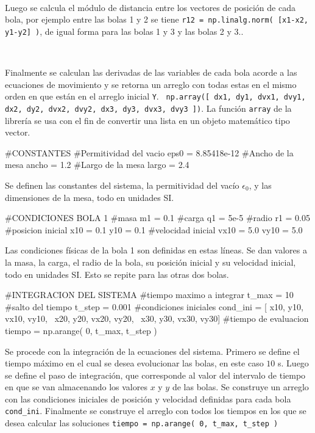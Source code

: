 \

Luego se calcula el módulo de distancia entre los vectores de posición de
cada bola, por ejemplo entre las bolas 1 y 2 se tiene
\texttt{r12 = np.linalg.norm( [x1-x2, y1-y2] )}, de igual forma para las 
bolas 1 y 3 y las bolas 2 y 3..

\

Finalmente se calculan las derivadas de las variables de cada bola acorde
a las ecuaciones de movimiento y se retorna un arreglo con todas estas en 
el mismo orden en que están en el arreglo inicial \texttt{Y}. \texttt{
np.array([ dx1, dy1, dvx1, dvy1, dx2, dy2, dvx2, dvy2, dx3, dy3, dvx3, dvy3 ])}.
La función \texttt{array} de la librería \numpy se usa con el fin de 
convertir una lista en un objeto matemático tipo vector.


\begin{listing}[style=python, numbers = none]
#CONSTANTES
#Permitividad del vacio
eps0 = 8.85418e-12
#Ancho de la mesa
ancho = 1.2
#Largo de la mesa
largo = 2.4
\end{listing}
Se definen las constantes del sistema, la permitividad del vacío $\epsilon_0$,
y las dimensiones de la mesa, todo en unidades SI.


\begin{listing}[style=python, numbers = none]
#CONDICIONES BOLA 1
#masa
m1 = 0.1
#carga
q1 = 5e-5
#radio 
r1 = 0.05
#posicion inicial
x10 = 0.1
y10 = 0.1
#velocidad inicial
vx10 = 5.0
vy10 = 5.0
\end{listing}
Las condiciones físicas de la bola 1 son definidas en estas líneas. Se dan
valores a la masa, la carga, el radio de la bola, su posición inicial y su 
velocidad inicial, todo en unidades SI. Esto se repite para las otras dos
bolas.


\begin{listing}[style=python, numbers = none]
#INTEGRACION DEL SISTEMA
#tiempo maximo a integrar
t_max = 10
#salto del tiempo
t_step = 0.001
#condiciones iniciales
cond_ini = [ x10, y10, vx10, vy10, \
x20, y20, vx20, vy20, \
x30, y30, vx30, vy30]
#tiempo de evaluacion
tiempo = np.arange( 0, t_max, t_step )
\end{listing}
Se procede con la integración de la ecuaciones del sistema. Primero se 
define el tiempo máximo en el cual se desea evolucionar las bolas, en este
caso $10$ s. Luego se define el paso de integración, que corresponde al 
valor del intervalo de tiempo en que se van almacenando los valores $x$ y 
$y$ de las bolas. Se construye un arreglo con las condiciones iniciales de 
posición y velocidad definidas para cada bola \texttt{cond\_ini}. Finalmente
se construye el arreglo con todos los tiempos en los que se desea calcular 
las soluciones \texttt{tiempo = np.arange( 0, t\_max, t\_step )}


